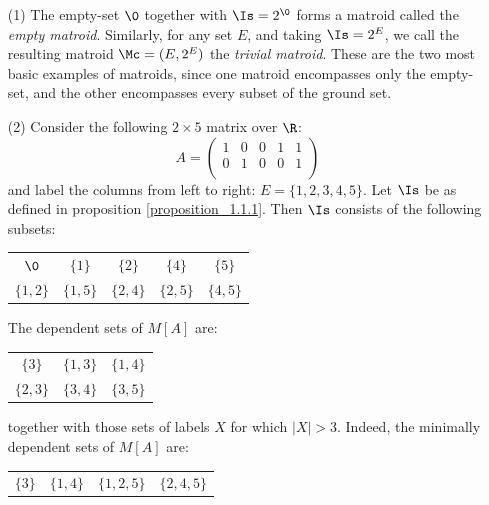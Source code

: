 \begin{example}\label{exampl_1.1}
  \begin{itemize}
    \item[(1)] The empty-set $\0$ together with $\Is=2^\0$ forms a
      matroid called the \textit{empty matroid}. Similarly, for any
      set $E$, and taking $\Is=2^E$, we call the resulting matroid
      $\Mc=(E,2^E)$ the \textit{trivial matroid}. These are the two
      most basic examples of matroids, since one matroid encompasses
      only the empty-set, and the other encompasses every subset of
      the ground set.

    \item[(2)] Consider the following $2 \times 5$ matrix over $\R$:
      \begin{equation*}
        A=
        \begin{pmatrix}
          1 & 0 & 0 & 1 & 1 \\
          0 & 1 & 0 & 0 & 1 \\
        \end{pmatrix}
      \end{equation*}
      and label the columns from left to right: $E=\{1, 2, 3, 4, 5\}$.
      Let $\Is$ be as defined in proposition \ref{proposition_1.1.1}.
      Then $\Is$ consists of the following subsets:
      \begin{center}
        \begin{tabular}{c c c c c }
          $\0$  & $\{1\}$ & $\{2\}$ & $\{4\}$ & $\{5\}$ \\
          $\{1, 2\}$  & $\{1, 5\}$  & $\{2, 4\}$  & $\{2, 5\}$ & $\{4, 5\}$  \\
        \end{tabular}
      \end{center}
      The dependent sets of $M[A]$ are:
      \begin{center}
        \begin{tabular}{c c c}
          $\{3\}$ & $\{1,3\}$ & $\{1,4\}$ \\
          $\{2,3\}$ & $\{3,4\}$ & $\{3,5\}$
        \end{tabular}
      \end{center}
      together with those sets of labels $X$ for which $|X|>3$.
      Indeed, the minimally dependent sets of $M[A]$ are:
      \begin{center}
        \begin{tabular}{c c c c}
          $\{3\}$ & $\{1,4\}$ & $\{1, 2, 5\}$ & $\{2,4,5\}$  \\
        \end{tabular}
      \end{center}
  \end{itemize}
\end{example}

